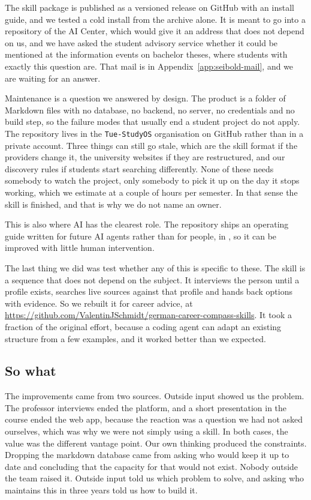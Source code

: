 \documentclass[11pt,a4paper]{article}
\begin{document}
\noindent The skill package is published as a versioned release on GitHub with
an install guide, and we tested a cold install from the archive alone. It is
meant to go into a repository of the AI Center, which would give it an address
that does not depend on us, and we have asked the student advisory service
whether it could be mentioned at the information events on bachelor theses,
where students with exactly this question are. That mail is in
Appendix~\ref{app:seibold-mail}, and we are waiting for an answer.


\noindent Maintenance is a question we answered by design. The product is a
folder of Markdown files with no database, no backend, no server, no credentials
and no build step, so the failure modes that usually end a student project do
not apply. The repository lives in the \texttt{Tue-StudyOS} organisation on
GitHub rather than in a private account. Three things can still go stale, which
are the skill format if the providers change it, the university websites if they
are restructured, and our discovery rules if students start searching
differently. None of these needs somebody to watch the project, only somebody to
pick it up on the day it stops working, which we estimate at a couple of hours
per semester. In that sense the skill is finished, and that is why we do not
name an owner.

\noindent This is also where AI has the clearest role. The repository ships an
operating guide written for future AI agents rather than for people, in
, so it can be improved with little human intervention.

\noindent The last thing we did was test whether any of this is specific to
these. The skill is a sequence that does not depend on the subject. It
interviews the person until a profile exists, searches live sources against that
profile and hands back options with evidence. So we rebuilt it for career
advice, at \url{https://github.com/ValentinJSchmidt/german-career-compass-skills}.
It took a fraction of the original effort, because a coding agent can adapt an
existing structure from a few examples, and it worked better than we expected.

\subsection*{So what}

\noindent The improvements came from two sources. Outside input showed us the
problem. The professor interviews ended the platform, and a short presentation
in the course ended the web app, because the reaction was a question we had not
asked ourselves, which was why we were not simply using a skill. In both cases,
the value was the different vantage point. Our own thinking produced the
constraints. Dropping the markdown database came from asking who would keep it
up to date and concluding that the capacity for that would not exist. Nobody
outside the team raised it. Outside input told us which problem to solve, and
asking who maintains this in three years told us how to build it.
\end{document}
